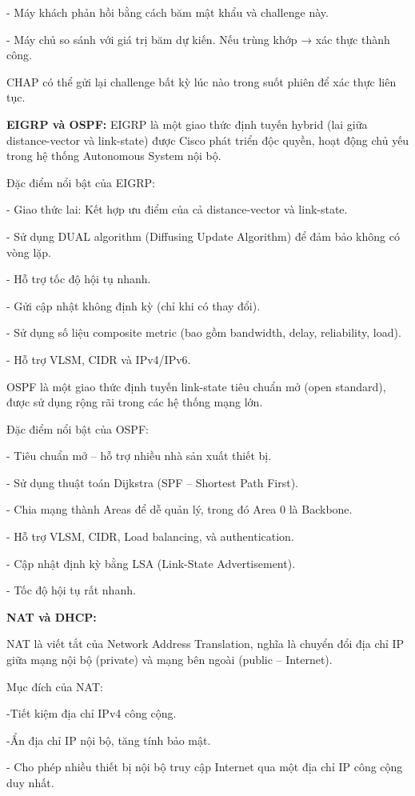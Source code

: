 \documentclass[13pt]{article}
\begin{document}
- Máy khách phản hồi bằng cách băm mật khẩu và challenge này.

- Máy chủ so sánh với giá trị băm dự kiến. Nếu trùng khớp → xác thực thành công.

CHAP có thể gửi lại challenge bất kỳ lúc nào trong suốt phiên để xác thực liên tục.


\textbf{EIGRP và OSPF:}
EIGRP là một giao thức định tuyến hybrid (lai giữa distance-vector và link-state) được Cisco phát triển độc quyền, hoạt động chủ yếu trong hệ thống Autonomous System nội bộ.

Đặc điểm nổi bật của EIGRP:

- Giao thức lai: Kết hợp ưu điểm của cả distance-vector và link-state.

- Sử dụng DUAL algorithm (Diffusing Update Algorithm) để đảm bảo không có vòng lặp.

- Hỗ trợ tốc độ hội tụ nhanh.

- Gửi cập nhật không định kỳ (chỉ khi có thay đổi).

- Sử dụng số liệu composite metric (bao gồm bandwidth, delay, reliability, load).

- Hỗ trợ VLSM, CIDR và IPv4/IPv6.


OSPF là một giao thức định tuyến link-state tiêu chuẩn mở (open standard), được sử dụng rộng rãi trong các hệ thống mạng lớn.

Đặc điểm nổi bật của OSPF:

- Tiêu chuẩn mở – hỗ trợ nhiều nhà sản xuất thiết bị.

- Sử dụng thuật toán Dijkstra (SPF – Shortest Path First).

- Chia mạng thành Areas để dễ quản lý, trong đó Area 0 là Backbone.

- Hỗ trợ VLSM, CIDR, Load balancing, và authentication.

- Cập nhật định kỳ bằng LSA (Link-State Advertisement).

- Tốc độ hội tụ rất nhanh.


\textbf{NAT và DHCP:}

NAT là viết tắt của Network Address Translation, nghĩa là chuyển đổi địa chỉ IP giữa mạng nội bộ (private) và mạng bên ngoài (public – Internet).

Mục đích của NAT:

-Tiết kiệm địa chỉ IPv4 công cộng.

-Ẩn địa chỉ IP nội bộ, tăng tính bảo mật.

- Cho phép nhiều thiết bị nội bộ truy cập Internet qua một địa chỉ IP công cộng duy nhất.
\end{document}
